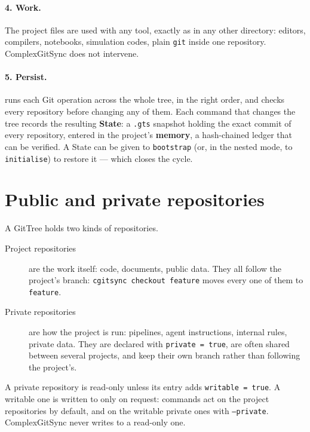 \paragraph{4. Work.} The project files are used with any tool, exactly as in
any other directory: editors, compilers, notebooks, simulation codes, plain
\texttt{git} inside one repository. ComplexGitSync does not intervene.

\paragraph{5. Persist.} \cgscli{} runs each Git operation across the whole
tree, in the right order, and checks every repository before changing any of
them. Each command that changes the tree records the resulting
\textbf{State}: a \texttt{.gts} snapshot holding the exact commit of every
repository, entered in the project's \textbf{memory}, a hash-chained ledger
that can be verified. A State can be given to \texttt{bootstrap} (or, in
the nested mode, to \texttt{initialise}) to restore it --- which closes the
cycle.

\section{Public and private repositories}

A GitTree holds two kinds of repositories.

\begin{description}
  \item[Project repositories] are the work itself: code, documents, public
    data. They all follow the project's branch: \texttt{cgitsync checkout
    feature} moves every one of them to \texttt{feature}.
  \item[Private repositories] are how the project is run: pipelines, agent
    instructions, internal rules, private data. They are declared with
    \texttt{private = true}, are often shared between several projects, and
    keep their own branch rather than following the project's.
\end{description}

A private repository is read-only unless its entry adds \texttt{writable =
true}. A writable one is written to only on request: commands act on the
project repositories by default, and on the writable private ones with
\texttt{--private}. ComplexGitSync never writes to a read-only one.

